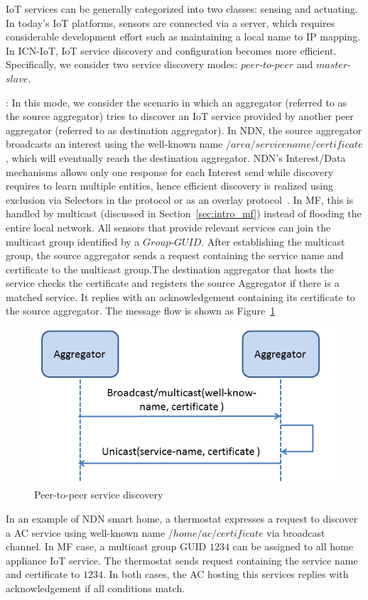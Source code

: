 IoT services can be generally categorized into two classes: sensing and actuating. In today's IoT platforms, sensors are connected via a server, which requires considerable development effort such as maintaining a local name to IP mapping. In ICN-IoT, IoT service discovery and configuration becomes more efficient. Specifically, we consider two service discovery modes: $peer$-$to$-$peer$ and $master$-$slave$.


\vspace{1mm}: In this mode, we consider the scenario in which an aggregator (referred to as the source aggregator) tries to discover an IoT service provided by another peer aggregator (referred to as destination aggregator). In NDN, the source aggregator broadcasts an interest using the well-known name $/area/servicename/certificate$, which will eventually reach the destination aggregator. NDN's Interest/Data mechanisms allows only one response for each Interest send while discovery requires to learn multiple entities, hence efficient discovery is realized using exclusion via Selectors in the protocol or as an overlay protocol~\cite{ravindran2013information}. In MF, this is handled by multicast (discussed in Section~\ref{sec:intro_mf}) instead of flooding the entire local network. All sensors that provide relevant services can join the multicast group identified by a $Group$-$GUID$. After establishing the multicast group, the source aggregator sends a request containing the service name and certificate to the multicast group.The destination aggregator that hosts the service checks the certificate and registers the source Aggregator if there is a matched service. It replies with an acknowledgement containing its certificate to the source aggregator. The message flow is shown as Figure~\ref{fig:ser_dis}
\begin{figure}
\includegraphics[width=\columnwidth]{figure/service_discovery.png}
\caption{\label{fig:ser_dis}Peer-to-peer service discovery}
\end{figure}
In an example of NDN smart home, a thermostat expresses a request to discover a AC service using well-known name $/home/ac/certificate$ via broadcast channel. In MF case, a multicast group GUID $1234$ can be assigned to all home appliance IoT service. The thermostat sends request containing the service name and certificate to $1234$. In both cases, the AC hosting this services replies with acknowledgement if all conditions match.


